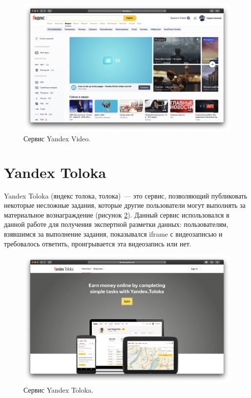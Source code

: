 \begin{figure}
    \centering
    \includegraphics[width=\textwidth]{../images/yandex_video.png}
    \caption{Сервис Yandex Video.}
    \label{fig:yandex_video}
\end{figure}

\section{Yandex Toloka}

Yandex Toloka \cite{Toloka} (яндекс толока, толока)~--- это сервис, позволяющий публиковать некоторые несложные задания, которые другие пользователи могут выполнять за материальное вознаграждение (рисунок \ref{fig:yandex_toloka}). Данный сервис использовался в данной работе для получения экспертной разметки данных: пользователям, взявшимся за выполнение задания, показывался iframe с видеозаписью и требовалось ответить, проигрывается эта видеозапись или нет.

\begin{figure}
    \centering
    \includegraphics[width=\textwidth]{../images/yandex_toloka.png}
    \caption{Сервис Yandex Toloka.}
    \label{fig:yandex_toloka}
\end{figure}

